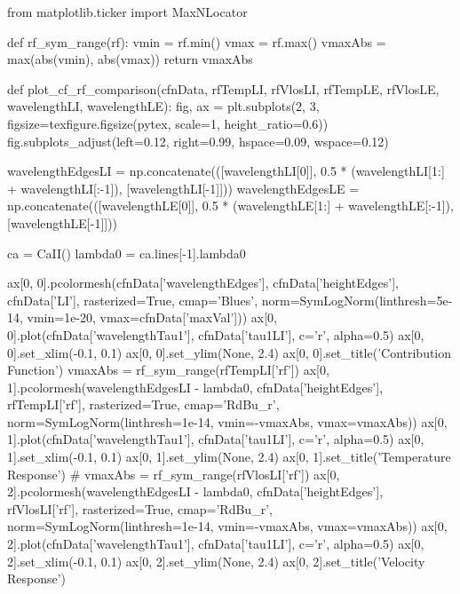 \begin{pycode}[TimeDepRT]
from matplotlib.ticker import MaxNLocator

def rf_sym_range(rf):
    vmin = rf.min()
    vmax = rf.max()
    vmaxAbs = max(abs(vmin), abs(vmax))
    return vmaxAbs

def plot_cf_rf_comparison(cfnData, rfTempLI, rfVlosLI,
                          rfTempLE, rfVlosLE, wavelengthLI, wavelengthLE):
    fig, ax = plt.subplots(2, 3, figsize=texfigure.figsize(pytex, scale=1, height_ratio=0.6))
    fig.subplots_adjust(left=0.12, right=0.99, hspace=0.09, wspace=0.12)

    wavelengthEdgesLI = np.concatenate(([wavelengthLI[0]],
                                        0.5 * (wavelengthLI[1:] + wavelengthLI[:-1]),
                                        [wavelengthLI[-1]]))
    wavelengthEdgesLE = np.concatenate(([wavelengthLE[0]],
                                        0.5 * (wavelengthLE[1:] + wavelengthLE[:-1]),
                                        [wavelengthLE[-1]]))

    ca = CaII()
    lambda0 = ca.lines[-1].lambda0

    ax[0, 0].pcolormesh(cfnData['wavelengthEdges'], cfnData['heightEdges'], cfnData['LI'],
                        rasterized=True, cmap='Blues',
                        norm=SymLogNorm(linthresh=5e-14, vmin=1e-20, vmax=cfnData['maxVal']))
    ax[0, 0].plot(cfnData['wavelengthTau1'], cfnData['tau1LI'], c='r', alpha=0.5)
    ax[0, 0].set_xlim(-0.1, 0.1)
    ax[0, 0].set_ylim(None, 2.4)
    ax[0, 0].set_title('Contribution Function')
    vmaxAbs = rf_sym_range(rfTempLI['rf'])
    ax[0, 1].pcolormesh(wavelengthEdgesLI - lambda0, cfnData['heightEdges'], rfTempLI['rf'],
                        rasterized=True, cmap='RdBu_r',
                        norm=SymLogNorm(linthresh=1e-14, vmin=-vmaxAbs, vmax=vmaxAbs))
    ax[0, 1].plot(cfnData['wavelengthTau1'], cfnData['tau1LI'], c='r', alpha=0.5)
    ax[0, 1].set_xlim(-0.1, 0.1)
    ax[0, 1].set_ylim(None, 2.4)
    ax[0, 1].set_title('Temperature Response')
    # vmaxAbs = rf_sym_range(rfVlosLI['rf'])
    ax[0, 2].pcolormesh(wavelengthEdgesLI - lambda0, cfnData['heightEdges'], rfVlosLI['rf'],
                        rasterized=True, cmap='RdBu_r',
                        norm=SymLogNorm(linthresh=1e-14, vmin=-vmaxAbs, vmax=vmaxAbs))
    ax[0, 2].plot(cfnData['wavelengthTau1'], cfnData['tau1LI'], c='r', alpha=0.5)
    ax[0, 2].set_xlim(-0.1, 0.1)
    ax[0, 2].set_ylim(None, 2.4)
    ax[0, 2].set_title('Velocity Response')


\end{pycode}

